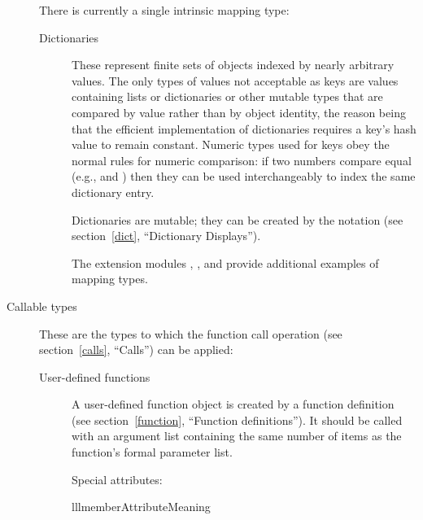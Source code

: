 \begin{description}
There is currently a single intrinsic mapping type:

\begin{description}

\item[Dictionaries]
These represent finite sets of objects indexed by
nearly arbitrary values.  The only types of values not acceptable as
keys are values containing lists or dictionaries or other mutable
types that are compared by value rather than by object identity, the
reason being that the efficient implementation of dictionaries
requires a key's hash value to remain constant.
Numeric types used for keys obey the normal rules for numeric
comparison: if two numbers compare equal (e.g.,  and
) then they can be used interchangeably to index the same
dictionary entry.

Dictionaries are mutable; they can be created by the
 notation (see section~\ref{dict}, ``Dictionary
Displays'').

The extension modules ,
, and
 provide additional examples of
mapping types.

\end{description} %

\item[Callable types]
These are the types to which the function call
operation (see section~\ref{calls}, ``Calls'') can be applied:

\begin{description}

\item[User-defined functions]
A user-defined function object is created by a function definition
(see section~\ref{function}, ``Function definitions'').  It should be
called with an argument
list containing the same number of items as the function's formal
parameter list.

Special attributes: 

\begin{tableiii}{lll}{member}{Attribute}{Meaning}{}



\end{tableiii}
\end{description}
\end{description}
